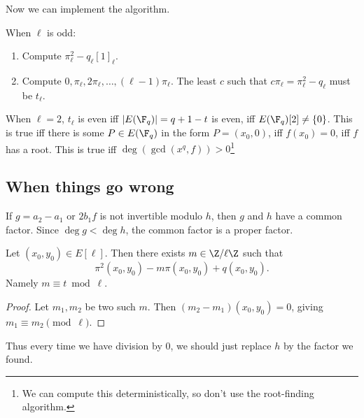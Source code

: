 Now we can implement the algorithm.
\begin{alg}
When $\ell$ is odd:
\begin{enumerate}
\item
Compute $\pi_{\ell}^2-q_{\ell}[1]_{\ell}$.
\item
Compute $0,\pi_{\ell},2\pi_{\ell},\ldots, (\ell-1)\pi_{\ell}$. The least $c$ such that $c\pi_{\ell}=\pi_{\ell}^2-q_{\ell}$ must be $t_{\ell}$. 
\end{enumerate}
When $\ell=2$, $t_{\ell}$ is even iff $|E(\F_q)|=q+1-t$ is even, iff $E(\F_q)[2]\ne \{0\}$. This is true iff there is some $P\in E(\F_q)$ in the form $P=(x_0,0)$, iff $f(x_0)=0$, iff $f$ has a root. This is true iff $\deg(\gcd(x^q,f))>0$\footnote{We can compute this deterministically, so don't use the root-finding algorithm.}
\end{alg}
\subsection{When things go wrong}
If $g=a_2-a_1$ or $2b_1f$ is not invertible modulo $h$, then $g$ and $h$ have a common factor. Since $\deg g<\deg h$, the common factor is a proper factor.
\begin{lem}
Let $(x_0,y_0)\in E[\ell]$. Then there exists $m\in \Z/\ell\Z$ such that
\[
\pi^2(x_0,y_0)-m\pi(x_0,y_0) + q(x_0,y_0).
\]
Namely $m\equiv t\bmod{\ell}$. 
\end{lem}
\begin{proof}
Let $m_1,m_2$ be two such $m$. Then $(m_2-m_1)(x_0,y_0)=0$, giving $m_1\equiv m_2\pmod{\ell}$.
\end{proof}
Thus every time we have division by 0, we should just replace $h$ by the factor we found.
